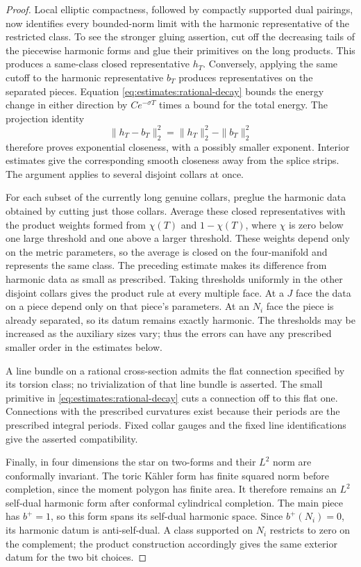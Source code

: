 \begin{proof}
Local elliptic compactness, followed by compactly supported dual
pairings, now identifies every bounded-norm limit with the harmonic
representative of the restricted class.  To see the stronger gluing
assertion, cut off the decreasing tails of the piecewise harmonic
forms and glue their primitives on the long products.  This produces
a same-class closed representative $h_T$.  Conversely, applying the
same cutoff to the harmonic representative $b_T$ produces
representatives on the separated pieces.  Equation
\eqref{eq:estimates:rational-decay} bounds the energy change in either
direction by $Ce^{-\sigma T}$ times a bound for the total energy.
The projection identity
\begin{equation}
            \|h_T-b_T\|_2^2=\|h_T\|_2^2-\|b_T\|_2^2
            \label{eq:estimates:minimizing-remainder}
\end{equation}
therefore proves exponential closeness, with a possibly smaller
exponent.  Interior estimates give the corresponding smooth
closeness away from the splice strips.  The argument applies to
several disjoint collars at once.

For each subset of the currently long genuine collars, preglue the
harmonic data obtained by cutting just those collars.  Average these
closed representatives with the product weights formed from
$\chi(T)$ and $1-\chi(T)$, where $\chi$ is zero below one large
threshold and one above a larger threshold.  These weights depend
only on the metric parameters, so the average is closed on the
four-manifold and represents the same class.  The preceding estimate
makes its difference from harmonic data as small as prescribed.
Taking thresholds uniformly in the other disjoint collars gives the
product rule at every multiple face.  At a $J$ face the data on a
piece depend only on that piece's parameters.  At an $N_i$ face the
piece is already separated, so its datum remains exactly harmonic.
The thresholds may be increased as the auxiliary sizes vary; thus
the errors can have any prescribed smaller order in the estimates
below.

A line bundle on a rational cross-section admits the flat connection
specified by its torsion class; no trivialization of that line bundle
is asserted.  The small primitive in
\eqref{eq:estimates:rational-decay} cuts a connection off to this flat
one.  Connections with the prescribed curvatures exist because their
periods are the prescribed integral periods.  Fixed collar gauges and
the fixed line identifications give the asserted compatibility.

Finally, in four dimensions the star on two-forms and their $L^2$ norm
are conformally invariant.  The toric K\"ahler form has finite squared
norm before completion, since the moment polygon has finite area.
It therefore remains an $L^2$ self-dual harmonic form after conformal
cylindrical completion.  The main piece has $b^+=1$, so this form
spans its self-dual harmonic space.  Since $b^+(N_i)=0$, its harmonic
datum is anti-self-dual.  A class supported on $N_i$ restricts to zero
on the complement; the product construction accordingly gives the
same exterior datum for the two bit choices.
\end{proof}


